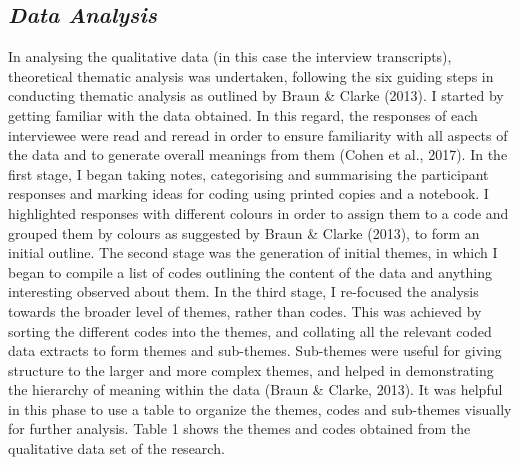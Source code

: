 \documentclass[11.5pt]{sig-alternate}
\begin{document}
\begin{large}
\subsection*{\textit{Data Analysis}}
In analysing the qualitative data (in this case the interview transcripts), theoretical thematic analysis was undertaken, following the six guiding steps in conducting thematic analysis as outlined by Braun \& Clarke (2013). I started by getting familiar with the data obtained. In this regard, the responses of each interviewee were read and reread in order to ensure familiarity with all aspects of the data and to generate overall meanings from them (Cohen et al., 2017). In the first stage, I began taking notes, categorising and summarising the participant responses and marking ideas for coding using printed copies and a notebook. I highlighted responses with different colours in order to assign them to a code and grouped them by colours as suggested by Braun \& Clarke (2013), to form an initial outline. The second stage was the generation of initial themes, in which I began to compile a list of codes outlining the content of the data and anything interesting observed about them. In the third stage, I re-focused the analysis towards the broader level of themes, rather than codes. This was achieved by sorting the different codes into the themes, and collating all the relevant coded data extracts to form themes and sub-themes. Sub-themes were useful for giving structure to the larger and more complex themes, and helped in demonstrating the hierarchy of meaning within the data (Braun \& Clarke, 2013). It was helpful in this phase to use a table to organize the themes, codes and sub-themes visually for further analysis. Table 1 shows the themes and codes obtained from the qualitative data set of the research. 


\end{large}
\end{document}
